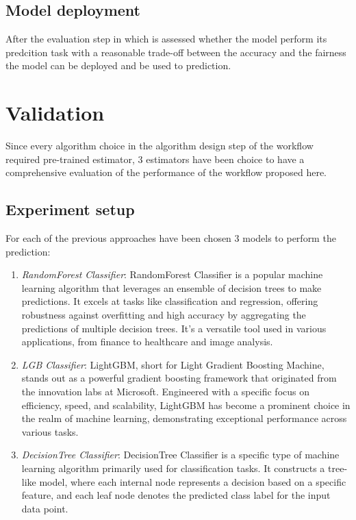 \documentclass[12pt,a4paper,openright,twoside]{book}
\begin{document}
\section{Model deployment}
\label{section:model-deployment}

After the evaluation step in which is assessed whether the model perform its predcition task with a reasonable trade-off between the accuracy and the fairness the model can be deployed and be used to prediction.

\chapter{Validation} %
\label{chap:validation}

Since every algorithm choice in the algorithm design step of the workflow required pre-trained estimator, 3 estimators have been choice to have a comprehensive evaluation of the performance of the workflow proposed here.

\section{Experiment setup}

For each of the previous approaches have been chosen 3 models to perform the prediction:

\begin{enumerate}

    \item \emph{RandomForest Classifier}: RandomForest Classifier is a popular machine learning algorithm that leverages an ensemble of decision trees to make predictions. It excels at tasks like classification and regression, offering robustness against overfitting and high accuracy by aggregating the predictions of multiple decision trees. It's a versatile tool used in various applications, from finance to healthcare and image analysis.
    
    \item \emph{LGB Classifier}: LightGBM, short for Light Gradient Boosting Machine, stands out as a powerful gradient boosting framework that originated from the innovation labs at Microsoft. Engineered with a specific focus on efficiency, speed, and scalability, LightGBM has become a prominent choice in the realm of machine learning, demonstrating exceptional performance across various tasks.
    
    \item \emph{DecisionTree Classifier}: DecisionTree Classifier is a specific type of machine learning algorithm primarily used for classification tasks. It constructs a tree-like model, where each internal node represents a decision based on a specific feature, and each leaf node denotes the predicted class label for the input data point.

\end{enumerate}
\end{document}
